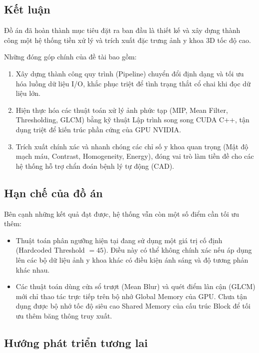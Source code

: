 \subsection*{Kết luận}

Đồ án đã hoàn thành mục tiêu đặt ra ban đầu là thiết kế và xây dựng thành công một hệ thống tiền xử lý và trích xuất đặc trưng ảnh y khoa 3D tốc độ cao.

Những đóng góp chính của đề tài bao gồm:

\begin{enumerate}
    \item Xây dựng thành công quy trình (Pipeline) chuyển đổi định dạng và tối ưu hóa luồng dữ liệu I/O, khắc phục triệt để tình trạng thắt cổ chai khi đọc dữ liệu lớn.
    
    \item Hiện thực hóa các thuật toán xử lý ảnh phức tạp (MIP, Mean Filter, Thresholding, GLCM) bằng kỹ thuật Lập trình song song CUDA C++, tận dụng triệt để kiến trúc phần cứng của GPU NVIDIA.
    
    \item Trích xuất chính xác và nhanh chóng các chỉ số y khoa quan trọng (Mật độ mạch máu, Contrast, Homogeneity, Energy), đóng vai trò làm tiền đề cho các hệ thống hỗ trợ chẩn đoán bệnh lý tự động (CAD).
\end{enumerate}

\subsection*{Hạn chế của đồ án}

Bên cạnh những kết quả đạt được, hệ thống vẫn còn một số điểm cần tối ưu thêm:

\begin{itemize}
    \item Thuật toán phân ngưỡng hiện tại đang sử dụng một giá trị cố định (Hardcoded Threshold $= 45$). Điều này có thể không chính xác nếu áp dụng lên các bộ dữ liệu ảnh y khoa khác có điều kiện ánh sáng và độ tương phản khác nhau.
    
    \item Các thuật toán dùng cửa sổ trượt (Mean Blur) và quét điểm lân cận (GLCM) mới chỉ thao tác trực tiếp trên bộ nhớ Global Memory của GPU. Chưa tận dụng được bộ nhớ tốc độ siêu cao Shared Memory của cấu trúc Block để tối ưu thêm băng thông truy xuất.
\end{itemize}

\subsection*{Hướng phát triển tương lai}

